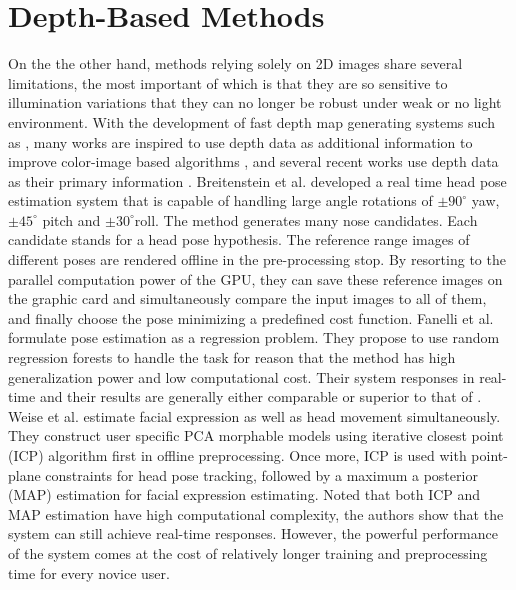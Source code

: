 \section{Depth-Based Methods}
On the the other hand, methods relying solely on 2D images share several limitations, the most important of which is that they are so sensitive to illumination variations that they can no longer be robust under weak or no light environment. With the development of fast depth map generating systems such as \cite{Weise:07:F3SWAMC}, many works are inspired to use depth data as additional information to improve color-image based algorithms \cite{Yang:02:MBHPTWS,Morency:03:PEU3VBE,Seemann:04:HPEUSVFHRI}, and several recent works use depth data as their primary information \cite{Breitenstein:08:RTFPEFSRI,Malassiotis:05:RRHPEFRD,Fanelli:11:RTHPEWRRF,fanelli_DAGM11,Weise:11:RPBFA}. Breitenstein et al. \cite{Breitenstein:08:RTFPEFSRI} developed a real time head pose estimation system that is capable of handling large angle rotations of $\pm 90^{\circ}$ yaw, $\pm 45^{\circ}$ pitch and $\pm 30^{\circ}$roll. The method generates many nose candidates. Each candidate  stands for a head pose hypothesis. The reference range images of different poses are rendered offline in the pre-processing stop. By resorting to the parallel computation power of the GPU, they can save these reference images on the graphic card and simultaneously compare the input images to all of them, and finally choose the pose minimizing a predefined cost function. Fanelli et al. \cite{Fanelli:11:RTHPEWRRF,fanelli_DAGM11} formulate pose estimation as a regression problem. They propose to use random regression forests to handle the task for reason that the method has high generalization power and low computational cost. Their system responses in real-time and their results are generally either comparable or superior to that of \cite{Breitenstein:08:RTFPEFSRI}. Weise et al. \cite{Weise:11:RPBFA} estimate facial expression as well as head movement simultaneously. They construct user specific PCA morphable models using iterative closest point (ICP) algorithm first in offline preprocessing. Once more, ICP is used with point-plane constraints for head pose tracking, followed by a maximum a posterior (MAP) estimation for facial expression estimating. Noted that both ICP and MAP estimation have high computational complexity, the authors show that the system can still achieve real-time responses. However, the powerful performance of the system comes at the cost of relatively longer training and preprocessing time for every novice user.

